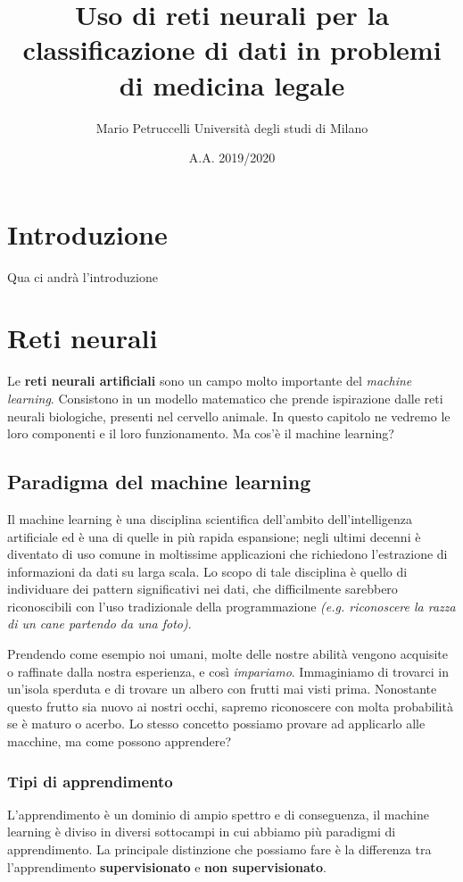 \documentclass[12pt, twoside, letterpaper]{report}
\title{Uso di reti neurali per la classificazione di dati in problemi di medicina legale}
\author{Mario Petruccelli \cr Università degli studi di Milano}
\date{A.A. 2019/2020}
\begin{document}
	\begin{titlepage}
		
		\newpage
		\tableofcontents
	\end{titlepage}

	\chapter*{Introduzione} 
		Qua ci andrà l'introduzione

		\newpage		
	\chapter{Reti neurali}
		Le \textbf{reti neurali artificiali} sono un campo molto importante del \textit{machine learning}. Consistono in un modello matematico che prende ispirazione dalle reti neurali biologiche, presenti nel cervello animale. In questo capitolo ne vedremo le loro componenti e il loro funzionamento. Ma cos'è il machine learning?

		\section{Paradigma del machine learning}
			Il machine learning è una disciplina scientifica dell'ambito dell'intelligenza artificiale ed è una di quelle in più rapida espansione; negli ultimi decenni è diventato di uso comune in moltissime applicazioni che richiedono l'estrazione di informazioni da dati su larga scala. Lo scopo di tale disciplina è quello di individuare dei pattern significativi nei dati, che difficilmente sarebbero riconoscibili con l'uso tradizionale della programmazione \textit{(e.g. riconoscere la razza di un cane partendo da una foto)}.  
			
			Prendendo come esempio noi umani, molte delle nostre abilità vengono acquisite o raffinate dalla nostra esperienza, e così \textit{impariamo}. Immaginiamo di trovarci in un'isola sperduta e di trovare un albero con frutti mai visti prima. Nonostante questo frutto sia nuovo ai nostri occhi, sapremo riconoscere con molta probabilità se è maturo o acerbo. Lo stesso concetto possiamo provare ad applicarlo alle macchine, ma come possono apprendere? 
			
			\subsection{Tipi di apprendimento} L'apprendimento è un dominio di ampio spettro e di conseguenza, il machine learning è diviso in diversi sottocampi in cui abbiamo più paradigmi di apprendimento. La principale distinzione che possiamo fare è la differenza tra l'apprendimento \textbf{supervisionato} e \textbf{non supervisionato}.
			
\end{document}
